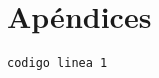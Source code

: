 \section{Apéndices}
 




\cite{porter2008cinco}




\begin{verbatim}
codigo linea 1
\end{verbatim}


